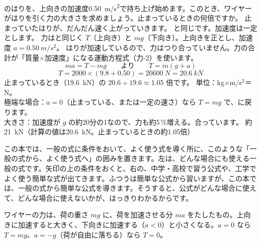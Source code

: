 \begin{phreidai}[荷を持ち上げ始めるときのワイヤー]\label{ph:力-0:ex2}
のはりを、上向きの加速度\qty{0.50}{m/s^2}で持ち上げ始めます。このとき、ワイヤーがはりを引く力の大きさを求めましょう。止まっているときの何倍ですか。
\phbamen
止まっていたはりが、だんだん速く上がっていきます。
\phmushi
{}と同じです。加速度は一定とします。
\phzu
力はと同じく $T$（上向き）と $mg$（下向き）。上向きを正とし、加速度 $a=\qty{0.50}{m/s^2}$。
\phriyu
はりが加速しているので、力はつり合っていません。力の合計が「質量×加速度」になる運動方程式（力-2）を使います。
\phtateru
\[ma=T-mg\qquad\text{より}\qquad T=m(g+a)\]
\phtoku
\[T=2000\times(9.8+0.50)=\qty{20600}{N}=\qty{20.6}{kN}\]
止まっているとき（\qty{19.6}{kN}）の $20.6\div19.6\approx1.05$ 倍です。
\phtashikame
単位：kg×m/s$^2$＝N。\\
極端な場合：$a=0$（止まっている、または一定の速さ）なら $T=mg$ で、に戻ります。\\
大きさ：加速度が $g$ の約20分の1なので、力も約5\,\%増える。合っています。
\kotae 約\qty{21}{kN}（計算の値は\qty{20.6}{kN}。止まっているときの約1.05倍）
\end{phreidai}
\begin{phflow}
\end{phflow}
\noindent この本では、一般の式に条件をおいて、よく使う式を導く所に、このような「一般の式から、よく使う式へ」の囲みを置きます。左は、どんな場合にも使える一般の式です。矢印の上の条件をおくと、右の、中学・高校で習う公式や、工学でよく使う簡単な式が出てきます。ふつうは簡単な公式から習いますが、この本では、一般の式から簡単な公式を導きます。そうすると、公式がどんな場合に使えて、どんな場合に使えないかが、はっきりわかるからです。
\begin{phyomi}[$T=m(g+a)$]
ワイヤーの力は、荷の重さ $mg$ に、荷を加速させる分 $ma$ をたしたもの。上向きに加速すると大きく、下向きに加速する（$a<0$）と小さくなる。$a=0$ なら $T=mg$、$a=-g$（荷が自由に落ちる）なら $T=0$。\par\noindent{}
\end{phyomi}

